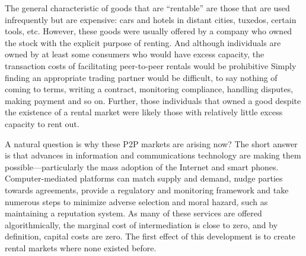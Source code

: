 \documentclass[11pt]{article}
\begin{document}


The general characteristic of goods that are ``rentable'' are those that are used infrequently but are expensive: 
cars and hotels in distant cities, tuxedos, certain tools, etc.
However, these goods were usually offered by a company who owned the stock with the explicit purpose of renting.  
And although individuals are owned by at least some consumers who would have excess capacity, the transaction costs of facilitating peer-to-peer rentals would be prohibitive
Simply finding an appropriate trading partner would be difficult, to say nothing of coming to terms, writing a contract, monitoring compliance, handling disputes, making payment and so on. 
Further, those individuals that owned a good despite the existence of a rental market were likely those with relatively little excess capacity to rent out. 

A natural question is why these P2P markets are arising now? 
The short answer is that advances in information and communications technology are making them possible---particularly the mass adoption of the Internet and smart phones.  
Computer-mediated platforms can match supply and demand, nudge parties towards agreements, provide a regulatory and monitoring framework and take numerous steps to minimize adverse selection and moral hazard, such as maintaining a reputation system. 
As many of these services are offered algorithmically, the marginal cost of intermediation is close to zero, and by definition, capital costs are zero.  
The first effect of this development is to create rental markets where none existed before. 
\end{document}
